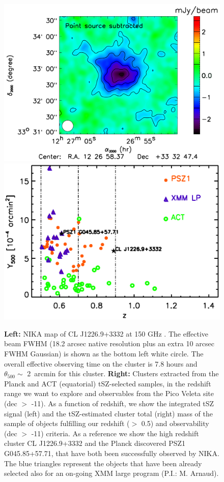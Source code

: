 \documentclass[11pt,a4paper,twoside,graphicx,color]{article}
\begin{document}
\begin{figure}
  \centering
   \includegraphics[width=0.47\columnwidth]{./Figures/CL1226.pdf}
   \includegraphics[width=0.49\columnwidth]{./Figures/NIKA2_cl_sample_y_withCL_xmm.eps}
\caption{{\small {\bf Left:} NIKA map of CL J1226.9+3332 at 150 GHz \citep[from][]{Adam2015}. The effective beam FWHM (18.2 arcsec native resolution plus an extra 10 arcsec FWHM Gaussian) is shown as the bottom left white circle.  The overall effective observing time on the cluster is 7.8 hours and $\theta_{500} \sim$ 2~arcmin for this cluster. {\bf Right:} Clusters extracted from the Planck and ACT (equatorial) tSZ-selected samples, in the redshift range we want to explore and observables from the Pico Veleta site (dec $>$ -11). As a function of redshift, we show the integrated tSZ signal (left) and the tSZ-estimated cluster total (right) mass of the sample of objects fulfilling our redshift ($>$ 0.5) and observability (dec $>$ -11) criteria. As a reference we show the high redshift cluster CL J1226.9+3332 and the Planck discovered PSZ1 G045.85+57.71, that have both been successfully observed by NIKA. The blue triangles represent the objects that have been already selected also for an on-going XMM large program (P.I.: M. Arnaud).}}
\label{Fig:CL_and_sample}
\end{figure}
\end{document}
